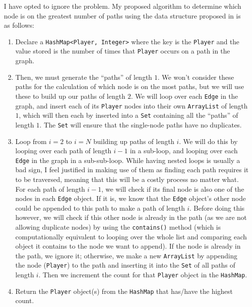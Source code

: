 \documentclass[a4paper,11pt]{article}
\begin{document}
I have opted to ignore the problem.
My proposed algorithm to determine which node is on the greatest number of paths using the data structure proposed in \textbf{} is as
follows:
\begin{enumerate}
    \item   Declare a \texttt{HashMap<Player, Integer>} where the key is the \texttt{Player} and the value stored is the number of times that \texttt{Player} occurs on
            a path in the graph.

    \item   Then, we must generate the ``paths'' of length $1$.
            We won't consider these paths for the calculation of which node is on the most paths, but we will use these to build up our paths of length $2$.
            We will loop over each \texttt{Edge} in the graph, and insert each of its \texttt{Player} nodes into their own \texttt{ArrayList} of length $1$,
            which will then each by inserted into a \texttt{Set} containing all the ``paths'' of length $1$.
            The \texttt{Set} will ensure that the single-node paths have no duplicates.

    \item   Loop from $i=2$ to $i=N$ building up paths of length $i$.
            We will do this by looping over each path of length $i-1$ in a sub-loop, and looping over each \texttt{Edge} in the graph in a sub-sub-loop.
            While having nested loops is usually a bad sign, I feel justified in making use of them as finding each path requires it to be traversed, meaning that this will be a costly
            process no matter what.
            For each path of length $i-1$, we will check if its final node is also one of the nodes in each \texttt{Edge} object. 
            If it is, we know that the \texttt{Edge} object's other node could be appended to this path to make a path of length $i$. 
            Before doing this however, we will check if this other node is already in the path (as we are not allowing duplicate nodes) by using the \texttt{contains()} method 
            (which is computationally equivalent to looping over the whole list and comparing each object it contains to the node we want to append).
            If the node is already in the path, we ignore it; otherwise, we make a new \texttt{ArrayList} by appending the node (\texttt{Player}) to the path and inserting 
            it into the \texttt{Set} of all paths of length $i$.
            Then we increment the count for that \texttt{Player} object in the \texttt{HashMap}.

    \item   Return the \texttt{Player} object(s) from the \texttt{HashMap} that has/have the highest count.
\end{enumerate}
\end{document}
